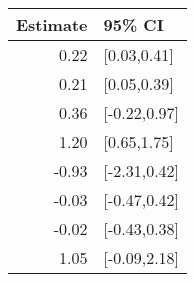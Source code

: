\begin{tabular}{rl}
  \hline
Estimate & 95\% CI \\ 
  \hline
0.22 & [0.03,0.41] \\ 
  0.21 & [0.05,0.39] \\ 
  0.36 & [-0.22,0.97] \\ 
  1.20 & [0.65,1.75] \\ 
  -0.93 & [-2.31,0.42] \\ 
  -0.03 & [-0.47,0.42] \\ 
  -0.02 & [-0.43,0.38] \\ 
  1.05 & [-0.09,2.18] \\ 
   \hline
\end{tabular}

